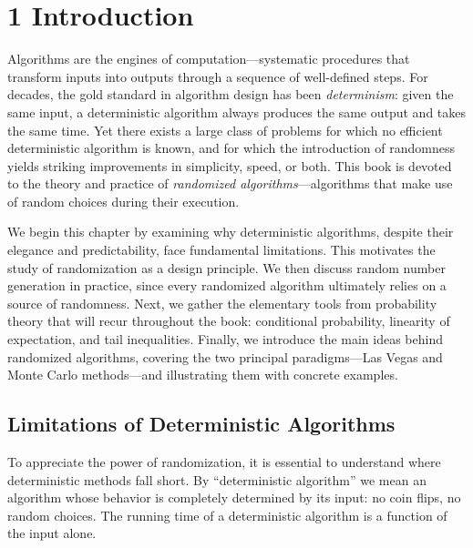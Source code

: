 \documentclass[twoside,12pt]{book}
\theoremstyle{plain}
\theoremstyle{definition}
\theoremstyle{remark}
\begin{document}
\chapter*{1 Introduction}
\label{ch:introduction}

Algorithms are the engines of computation---systematic procedures that
transform inputs into outputs through a sequence of well-defined steps.
For decades, the gold standard in algorithm design has been
\emph{determinism}: given the same input, a deterministic algorithm always
produces the same output and takes the same time. Yet there exists a large
class of problems for which no efficient deterministic algorithm is known,
and for which the introduction of randomness yields striking improvements in
simplicity, speed, or both. This book is devoted to the theory and practice
of \emph{randomized algorithms}---algorithms that make use of random choices
during their execution.

We begin this chapter by examining why deterministic algorithms, despite
their elegance and predictability, face fundamental limitations. This
motivates the study of randomization as a design principle. We then
discuss random number generation in practice, since every randomized
algorithm ultimately relies on a source of randomness. Next, we gather
the elementary tools from probability theory that will recur throughout
the book: conditional probability, linearity of expectation, and tail
inequalities. Finally, we introduce the main ideas behind randomized
algorithms, covering the two principal paradigms---Las Vegas and Monte
Carlo methods---and illustrating them with concrete examples.

\section{Limitations of Deterministic Algorithms}
\label{sec:det-limits}

To appreciate the power of randomization, it is essential to understand
where deterministic methods fall short. By ``deterministic algorithm'' we
mean an algorithm whose behavior is completely determined by its input: no
coin flips, no random choices. The running time of a deterministic algorithm
is a function of the input alone.
\end{document}
